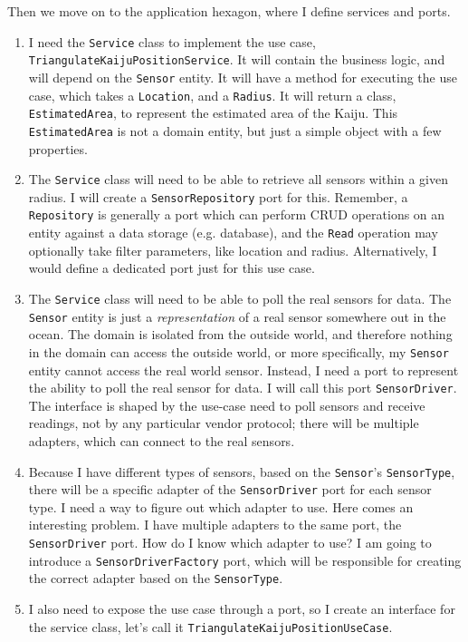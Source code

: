 Then we move on to the application hexagon, where I define services and ports.

\begin{enumerate}
    \item I need the \texttt{Service} class to implement the use case, \texttt{TriangulateKaijuPositionService}. It will contain the business logic, and will depend on the \texttt{Sensor} entity. It will have a method for executing the use case, which takes a \texttt{Location}, and a \texttt{Radius}. It will return a class, \texttt{EstimatedArea}, to represent the estimated area of the Kaiju. This \texttt{EstimatedArea} is not a domain entity, but just a simple object with a few properties.
    \item The \texttt{Service} class will need to be able to retrieve all sensors within a given radius. I will create a \texttt{SensorRepository} port for this. Remember, a \texttt{Repository} is generally a port which can perform CRUD operations on an entity against a data storage (e.g. database), and the \texttt{Read} operation may optionally take filter parameters, like location and radius. Alternatively, I would define a dedicated port just for this use case.
    \item The \texttt{Service} class will need to be able to poll the real sensors for data. The \texttt{Sensor} entity is just a \textit{representation} of a real sensor somewhere out in the ocean. The domain is isolated from the outside world, and therefore nothing in the domain can access the outside world, or more specifically, my \texttt{Sensor} entity cannot access the real world sensor. Instead, I need a port to represent the ability to poll the real sensor for data. I will call this port \texttt{SensorDriver}. The interface is shaped by the use-case need to poll sensors and receive readings, not by any particular vendor protocol; there will be multiple adapters, which can connect to the real sensors.
    \item Because I have different types of sensors, based on the \texttt{Sensor}'s \texttt{SensorType}, there will be a specific adapter of the \texttt{SensorDriver} port for each sensor type. I need a way to figure out which adapter to use. Here comes an interesting problem. I have multiple adapters to the same port, the \texttt{SensorDriver} port. How do I know which adapter to use? I am going to introduce a \texttt{SensorDriverFactory} port, which will be responsible for creating the correct adapter based on the \texttt{SensorType}.
    \item I also need to expose the use case through a port, so I create an interface for the service class, let's call it \texttt{TriangulateKaijuPositionUseCase}.
\end{enumerate}

